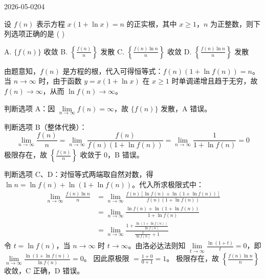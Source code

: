 \begin{mistake}{2026-05-02}{04}

\begin{problemcontent}
设 \(f(n)\) 表示方程 \(x(1+\ln x)=n\) 的正实根，其中 \(x \geqslant 1\)，\(n\) 为正整数，则下列选项正确的是 ( )

A. \(\{f(n)\}\) 收敛 \qquad B. \(\left\{\frac{f(n)}{n}\right\}\) 发散 \qquad C. \(\left\{\frac{f(n)\ln n}{n}\right\}\) 收敛 \qquad D. \(\left\{\frac{f(n)\ln n}{n}\right\}\) 发散
\end{problemcontent}

\begin{solutioncontent}
由题意知，\(f(n)\) 是方程的根，代入可得恒等式：\(f(n)(1+\ln f(n)) = n\)。
当 \(n \to \infty\) 时，由于函数 \(y = x(1+\ln x)\) 在 \(x \geqslant 1\) 时单调递增且趋于无穷，故 \(f(n) \to \infty\)，从而 \(\ln f(n) \to \infty\)。

判断选项 A：因 \(\lim\limits_{n\to\infty} f(n) = \infty\)，故 \(\{f(n)\}\) 发散，A 错误。

判断选项 B（整体代换）：
\[ \lim_{n \to \infty} \frac{f(n)}{n} = \lim_{n \to \infty} \frac{f(n)}{f(n)(1+\ln f(n))} = \lim_{n \to \infty} \frac{1}{1+\ln f(n)} = 0 \]
极限存在，故 \(\left\{\frac{f(n)}{n}\right\}\) 收敛于 0，B 错误。

判断选项 C、D：对恒等式两端取自然对数，得 \(\ln n = \ln f(n) + \ln(1+\ln f(n))\)。代入所求极限式中：
\[
\begin{aligned}
\lim_{n \to \infty} \frac{f(n)\ln n}{n} &= \lim_{n \to \infty} \frac{f(n)[\ln f(n) + \ln(1+\ln f(n))]}{f(n)(1+\ln f(n))} \\
&= \lim_{n \to \infty} \frac{\ln f(n) + \ln(1+\ln f(n))}{1+\ln f(n)} \\
&= \lim_{n \to \infty} \frac{1 + \frac{\ln(1+\ln f(n))}{\ln f(n)}}{\frac{1}{\ln f(n)} + 1}
\end{aligned}
\]
令 \(t = \ln f(n)\)，当 \(n \to \infty\) 时 \(t \to \infty\)。由洛必达法则知 \(\lim\limits_{t\to\infty} \frac{\ln(1+t)}{t} = 0\)，即 \(\lim\limits_{n \to \infty} \frac{\ln(1+\ln f(n))}{\ln f(n)} = 0\)。
因此原极限 \(= \frac{1+0}{0+1} = 1\)。
极限存在，故 \(\left\{\frac{f(n)\ln n}{n}\right\}\) 收敛，C 正确，D 错误。
\end{solutioncontent}


\end{mistake}
